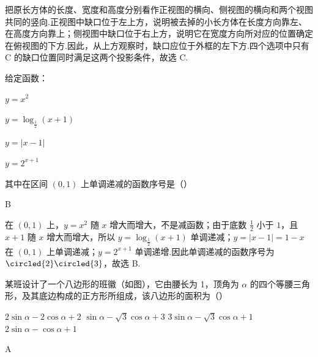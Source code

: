 \begin{solution}
把原长方体的长度、宽度和高度分别看作正视图的横向、侧视图的横向和两个视图共同的竖向.正视图中缺口位于左上方，说明被去掉的小长方体在长度方向靠左、在高度方向靠上；侧视图中缺口位于右上方，说明它在宽度方向所对应的位置确定在俯视图的下方.因此，从上方观察时，缺口应位于外框的左下方.四个选项中只有 C 的缺口位置同时满足这两个投影条件，故选 C.
\end{solution}

\begin{problem}
给定函数：

\begin{circlelist}
\item \( y = x^{2} \)
\item \( y = \log_{\frac{1}{2}}(x + 1) \)
\item \( y = |x - 1| \)
\item \( y = 2^{x + 1} \)
\end{circlelist}

其中在区间 \( (0, 1) \) 上单调递减的函数序号是（\quad）

\choices
    {}
    {}
    {}
    {}
\end{problem}

\begin{answer}
B
\end{answer}

\begin{solution}
在 \((0,1)\) 上，\(y=x^2\) 随 \(x\) 增大而增大，不是减函数；由于底数 \(\frac{1}{2}\) 小于 \(1\)，且 \(x+1\) 随 \(x\) 增大而增大，所以 \(y=\log_{\frac{1}{2}}(x+1)\) 单调递减；\(y=|x-1|=1-x\) 在 \((0,1)\) 上单调递减；\(y=2^{x+1}\) 单调递增.因此单调递减的函数序号为 \(\circled{2}\circled{3}\)，故选 B.
\end{solution}

\begin{problem}
某班设计了一个八边形的班徽（如图），它由腰长为 1，顶角为 \(\alpha\) 的四个等腰三角形，及其底边构成的正方形所组成，该八边形的面积为（\quad）


\choices
    {\(2\sin \alpha - 2\cos \alpha + 2\)}
    {\(\sin \alpha -\sqrt{3}\cos \alpha +3\)}
    {\(3\sin \alpha -\sqrt{3}\cos \alpha +1\)}
    {\(2\sin \alpha -\cos \alpha +1\)}
\end{problem}

\begin{answer}
A
\end{answer}

